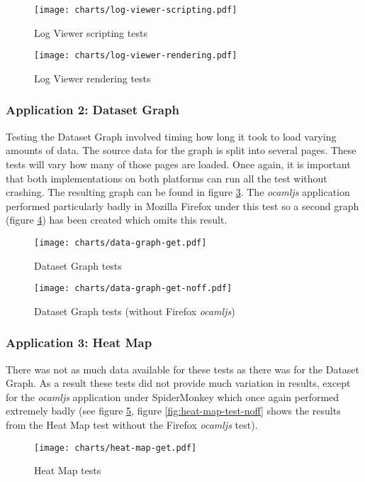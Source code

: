 \begin{figure}
  \texttt{[image: charts/log-viewer-scripting.pdf]}
  \caption{Log Viewer scripting tests}
  \label{fig:log-viewer-scripting}
\end{figure}

\begin{figure}
  \texttt{[image: charts/log-viewer-rendering.pdf]}
  \caption{Log Viewer rendering tests}
  \label{fig:log-viewer-rendering}
\end{figure}

\subsubsection{Application 2: Dataset Graph}
Testing the Dataset Graph involved timing how long it took to load varying amounts of data. The source data for the graph is split into several pages. These tests will vary how many of those pages are loaded. Once again, it is important that both implementations on both platforms can run all the test without crashing. The resulting graph can be found in figure \ref{fig:data-graph-test}. The \emph{ocamljs} application performed particularly badly in Mozilla Firefox under this test so a second graph (figure \ref{fig:data-graph-test-noff}) has been created which omits this result.

\begin{figure}
  \texttt{[image: charts/data-graph-get.pdf]}
  \caption{Dataset Graph tests}
  \label{fig:data-graph-test}
\end{figure}

\begin{figure}
  \texttt{[image: charts/data-graph-get-noff.pdf]}
  \caption{Dataset Graph tests (without Firefox \emph{ocamljs})}
  \label{fig:data-graph-test-noff}
\end{figure}

\subsubsection{Application 3: Heat Map}
There was not as much data available for these tests as there was for the Dataset Graph. As a result these tests did not provide much variation in results, except for the \emph{ocamljs} application under SpiderMonkey which once again performed extremely badly (see figure \ref{fig:heat-map-test}, figure \ref{fig:heat-map-test-noff} shows the results from the Heat Map test without the Firefox \emph{ocamljs} test).

\begin{figure}
  \texttt{[image: charts/heat-map-get.pdf]}
  \caption{Heat Map tests}
  \label{fig:heat-map-test}
\end{figure}

